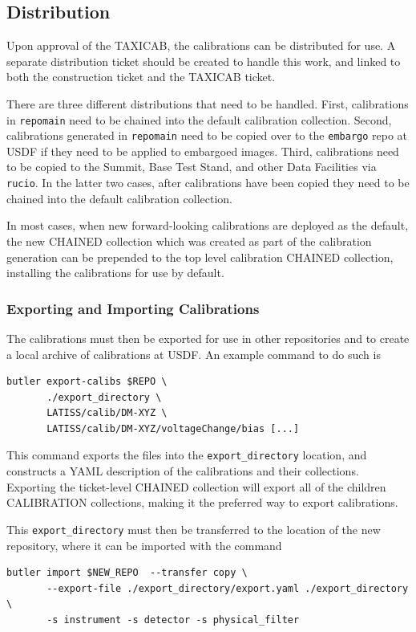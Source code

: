 \documentclass[DM,authoryear,toc]{lsstdoc}
\begin{document}
\subsection{Distribution}
\label{sec:calib_export}
Upon approval of the TAXICAB, the calibrations can be distributed for use.
A separate distribution ticket should be created to handle this work, and linked to both the construction ticket and the TAXICAB ticket.

There are three different distributions that need to be handled.
First, calibrations in \texttt{\/repo\/main} need to be chained into the default calibration collection.
Second, calibrations generated in \texttt{\/repo\/main} need to be copied over to the \texttt{embargo} repo at USDF if they need to be applied to embargoed images.
Third, calibrations need to be copied to the Summit, Base Test Stand, and other Data Facilities via \texttt{rucio}.
In the latter two cases, after calibrations have been copied they need to be chained into the default calibration collection.

In most cases, when new forward-looking calibrations are deployed as the default, the new CHAINED collection which was created as part of the calibration generation can be prepended to the top level calibration CHAINED collection, installing the calibrations for use by default.

\subsubsection{Exporting and Importing Calibrations}

The calibrations must then be exported for use in other repositories and to create a local archive of calibrations at USDF.
An example command to do such is
\begin{verbatim}
butler export-calibs $REPO \
       ./export_directory \
       LATISS/calib/DM-XYZ \
       LATISS/calib/DM-XYZ/voltageChange/bias [...]
\end{verbatim}
This command exports the files into the \verb|export_directory| location, and constructs a YAML description of the calibrations and their collections.
Exporting the ticket-level CHAINED collection will export all of the children CALIBRATION collections, making it the preferred way to export calibrations.

This \verb|export_directory| must then be transferred to the location of the new repository, where it can be imported with the command
\begin{verbatim}
butler import $NEW_REPO  --transfer copy \
       --export-file ./export_directory/export.yaml ./export_directory \
       -s instrument -s detector -s physical_filter
\end{verbatim}
\end{document}
